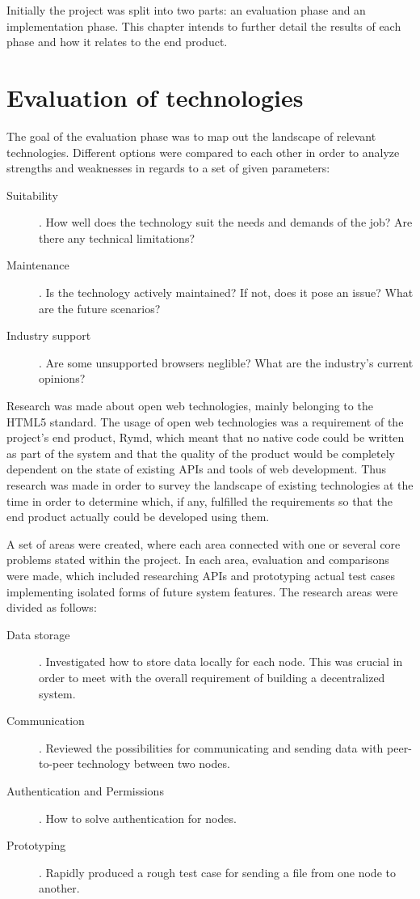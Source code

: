 Initially the project was split into two parts: an evaluation phase and an implementation phase. This chapter intends to further detail the results of each phase and how it relates to the end product.

\section{Evaluation of technologies}

The goal of the evaluation phase was to map out the landscape of relevant technologies. Different options were compared  to each other in order to analyze strengths and weaknesses in regards to a set of given parameters:

\begin{description}
  \item[Suitability]. How well does the technology suit the needs and demands of the job? Are there any technical limitations?
  \item[Maintenance]. Is the technology actively maintained? If not, does it pose an issue? What are the future scenarios?
  \item[Industry support]. Are some unsupported browsers neglible? What are the industry's current opinions?
\end{description}

Research was made about open web technologies, mainly belonging to the HTML5 standard. The usage of open web technologies was a requirement of the project's end product, Rymd, which meant that no native code could be written as part of the system and that the quality of the product would be completely dependent on the state of existing APIs and tools of web development. Thus research was made in order to survey the landscape of existing technologies at the time in order to determine which, if any, fulfilled the requirements so that the end product actually could be developed using them.

A set of areas were created, where each area connected with one or several core problems stated within the project. In each area, evaluation and comparisons were made, which included researching APIs and prototyping actual test cases implementing isolated forms of future system features. The research areas were divided as follows:

\begin{description}
\item[Data storage]. Investigated how to store data locally for each node. This was crucial in order to meet with the overall requirement of building a decentralized system.
\item[Communication]. Reviewed the possibilities for communicating and sending data with peer-to-peer technology between two nodes.
\item[Authentication and Permissions]. How to solve authentication for nodes.
\item[Prototyping]. Rapidly produced a rough test case for sending a file from one node to another.
\end{description}

